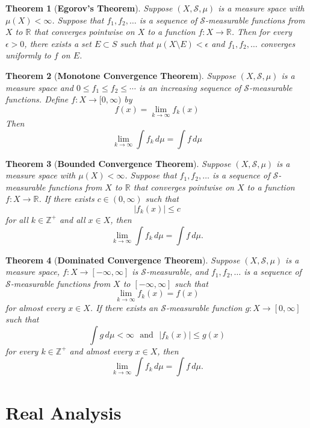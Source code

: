 \documentclass[answers, a4paper, 12pt]{exam}
\newtheorem{theorem}{Theorem}[section]
\newcommand{\R}{\mathbb{R}}
\newcommand{\Z}{\mathbb{Z}}
\begin{document}
\begin{theorem}[\textbf{Egorov's Theorem}]
    Suppose $(X, \mathcal{S}, \mu)$ is a measure space with $\mu(X)<\infty$. Suppose that $f_1,f_2,\ldots$ is a sequence of $\mathcal{S}$-measurable functions from $X$ to $\R$ that converges pointwise on $X$ to a function $f:X\to\R$. Then for every $\epsilon>0$, there exists a set $E\subset S$ such that $\mu(X\setminus E)<\epsilon$ and $f_1,f_2,\ldots$ converges uniformly to $f$ on $E$.
\end{theorem}

\begin{theorem}[\textbf{Monotone Convergence Theorem}]
    Suppose $(X, \mathcal{S}, \mu)$ is a measure space and $0\leq f_1\leq f_2\leq\cdots$ is an increasing sequence of $\mathcal{S}$-measurable functions. Define $f:X\to[0,\infty)$ by
    $$f(x)=\lim_{k\to\infty}{f_k(x)}$$
    Then
    $$\lim_{k\to\infty}{\int{f_k\,d\mu}}=\int{f\, d\mu}$$
\end{theorem}

\begin{theorem}[\textbf{Bounded Convergence Theorem}]
    Suppose $(X, \mathcal{S}, \mu)$ is a measure space with $\mu(X)<\infty$. Suppose that $f_1,f_2,\ldots$ is a sequence of $\mathcal{S}$-measurable functions from $X$ to $\R$ that converges pointwise on $X$ to a function $f:X\to\R$. If there exists $c\in(0,\infty)$ such that 
    $$|f_k(x)|\leq c$$
    for all $k\in\Z^+$ and all $x\in X$, then
    $$\lim_{k\to\infty}{\int{f_k\,d\mu}}=\int{f\, d\mu}.$$
\end{theorem}

\begin{theorem}[\textbf{Dominated Convergence Theorem}]
    Suppose $(X, \mathcal{S}, \mu)$ is a measure space, $f:X\to[-\infty, \infty]$ is $\mathcal{S}$-measurable, and $f_1,f_2,\ldots$ is a sequence of $\mathcal{S}$-measurable functions from $X$ to $[-\infty, \infty]$ such that
    $$\lim_{k\to\infty}{f_k(x)}=f(x)$$
    for almost every $x\in X$. If there exists an $\mathcal{S}$-measurable function $g:X\to[0, \infty]$ such that
    $$\int{g\,d\mu}<\infty\,\,\,\,\text{and}\,\,\,\,|f_k(x)|\leq g(x)$$
    for every $k\in\Z^+$ and almost every $x\in X$, then
    $$\lim_{k\to\infty}{\int{f_k\,d\mu}}=\int{f\, d\mu}.$$
\end{theorem}

\newpage
\section{Real Analysis}
\end{document}
